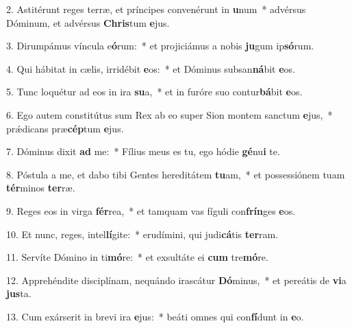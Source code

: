 2. Astitérunt reges terræ, et príncipes convenérunt in \textbf{u}num~*  advérsus Dóminum, et advérsus \textbf{Chris}tum \textbf{e}jus.\

3. Dirumpámus víncula e\textbf{ó}rum:~*  et projiciámus a nobis \textbf{ju}gum ip\textbf{só}rum.\

4. Qui hábitat in cælis, irridébit \textbf{e}os:~*  et Dóminus subsan\textbf{ná}bit \textbf{e}os.\

5. Tunc loquétur ad eos in ira \textbf{su}a,~*  et in furóre suo contur\textbf{bá}bit \textbf{e}os.\

6. Ego autem constitútus sum Rex ab eo super Sion montem sanctum \textbf{e}jus,~*  prǽdicans præ\textbf{cép}tum \textbf{e}jus.\

7. Dóminus dixit \textbf{ad} me:~*  Fílius meus es tu, ego hódie \textbf{gé}nu\textbf{i} te.\

8. Póstula a me, et dabo tibi Gentes hereditátem \textbf{tu}am,~*  et possessiónem tuam \textbf{tér}minos \textbf{ter}ræ.\

9. Reges eos in virga \textbf{fér}rea,~*  et tamquam vas fíguli con\textbf{frín}ges \textbf{e}os.\

10. Et nunc, reges, intel\textbf{lí}gite:~*  erudímini, qui judi\textbf{cá}tis \textbf{ter}ram.\

11. Servíte Dómino in ti\textbf{mó}re:~*  et exsultáte ei \textbf{cum} tre\textbf{mó}re.\

12. Apprehéndite disciplínam, nequándo irascátur \textbf{Dó}minus,~*  et pereátis de \textbf{vi}a \textbf{jus}ta.\

13. Cum exárserit in brevi ira \textbf{e}jus:~*  beáti omnes qui con\textbf{fí}dunt in \textbf{e}o.\

